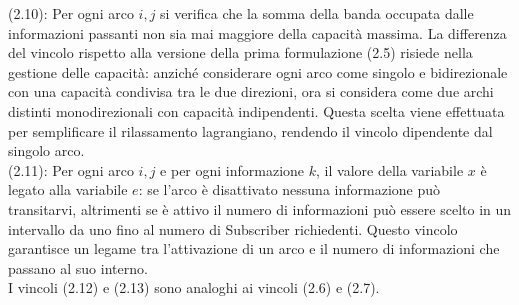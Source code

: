 \documentclass[12pt,a4paper,twoside]{report}
\begin{document}
	(2.10): Per ogni arco $i,j$ si verifica che la somma della banda occupata dalle informazioni passanti non sia mai maggiore della capacità massima.	
	La differenza del vincolo rispetto alla versione della prima formulazione (2.5) risiede nella gestione delle capacità: anziché considerare ogni arco come singolo e bidirezionale con una capacità condivisa tra le due direzioni, ora si considera come due archi distinti monodirezionali con capacità indipendenti. Questa scelta viene effettuata per semplificare il rilassamento lagrangiano, rendendo il vincolo dipendente dal singolo arco.\\
	(2.11): Per ogni arco $i,j$ e per ogni informazione $k$, il valore della variabile $x$ è legato alla variabile $e$: se l'arco è disattivato nessuna informazione può transitarvi, altrimenti se è attivo il numero di informazioni può essere scelto in un intervallo da uno fino al numero di Subscriber richiedenti.
	Questo vincolo garantisce un legame tra l'attivazione di un arco e il numero di informazioni che passano al suo interno.\\
	I vincoli (2.12) e (2.13) sono analoghi ai vincoli (2.6) e (2.7). 
\end{document}
